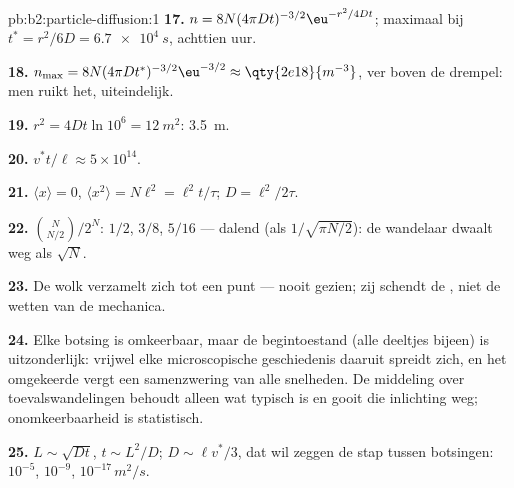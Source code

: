 \begin{solution}{pb:b2:particle-diffusion:1}
\textbf{17.} $n = 8N(4\pi Dt)^{-3/2}\eu^{-r^2/4Dt}$; maximaal bij
$t^* = r^2/6D =
\qty{6.7e4}{s}$, achttien uur.

\textbf{18.} $n_{\max} = 8N(4\pi Dt^*)^{-3/2}\eu^{-3/2} \approx \qty{2e18}{m^{-3}}$,
ver boven de drempel: men ruikt het, uiteindelijk.

\textbf{19.} $r^2 = 4Dt\ln 10^6 = \qty{12}{m^2}$: \qty{3.5}{m}.

\textbf{20.} $v^*t/\ell \approx 5 \times 10^{14}$.

\textbf{21.} $\langle x\rangle = 0$, $\langle x^2\rangle = N\ell^2 = \ell^2 t/\tau$;
$D = \ell^2/2\tau$.

\textbf{22.} $\binom{N}{N/2}/2^N$: $1/2$, $3/8$, $5/16$ --- dalend
(als $1/\sqrt{\pi N/2}$): de wandelaar dwaalt weg als $\sqrt N$.

\textbf{23.} De wolk verzamelt zich tot een punt --- nooit gezien; zij
schendt de , niet de wetten van de mechanica.

\textbf{24.} Elke botsing is omkeerbaar, maar de begintoestand (alle
deeltjes bijeen) is uitzonderlijk: vrijwel elke microscopische geschiedenis
daaruit spreidt zich, en het omgekeerde vergt een samenzwering van alle
snelheden. De middeling over toevalswandelingen behoudt alleen wat typisch is en
gooit die inlichting weg; onomkeerbaarheid is statistisch.

\textbf{25.} $L \sim \sqrt{Dt}$, $t \sim L^2/D$; $D \sim \ell v^*/3$, dat wil zeggen
de stap tussen botsingen: $10^{-5}$, $10^{-9}$, $10^{-17}\,\unit{m^2/s}$.
\end{solution}
